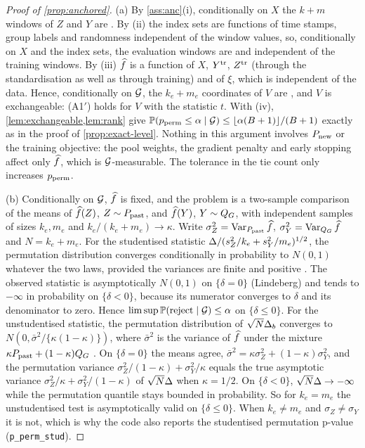 \begin{proof}[Proof of \cref{prop:anchored}]
(a) By \cref{ass:anc}(i), conditionally on $X$ the $k+m$ windows of $Z$ and $Y$ are \iid. By (ii)
the index sets are functions of time stamps, group labels and randomness independent of the
window values, so, conditionally on $X$ and the index sets, the evaluation windows are \iid{} and
independent of the training windows. By (iii) $\widehat{f}$ is a function of $X$, $Y^{\mathrm{tr}}$, $Z^{\mathrm{tr}}$
(through the standardisation as well as through training) and of $\xi$, which is independent of
the data. Hence, conditionally on $\mathcal{G}$, the $k_e+m_e$ coordinates of $V$ are \iid{}, and $V$ is
exchangeable: (A1$'$) holds for $V$ with the statistic $t$. With (iv), \cref{lem:exchangeable,lem:rank}
give $\mathbb{P}(p_{\mathrm{perm}}\le\alpha\mid\mathcal{G})\le\lfloor\alpha(B+1)\rfloor/(B+1)$ exactly as in the proof of
\cref{prop:exact-level}. Nothing in this argument involves $P_{\mathrm{new}}$ or the training objective: the
pool weights, the gradient penalty and early stopping affect only $\widehat{f}$, which is
$\mathcal{G}$-measurable. The tolerance in the tie count only increases $p_{\mathrm{perm}}$.

(b) Conditionally on $\mathcal{G}$, $\widehat{f}$ is fixed, and the problem is a two-sample comparison of the
means of $\widehat{f}(Z)$, $Z\sim P_{\mathrm{past}}$, and $\widehat{f}(Y)$, $Y\sim Q_{G}$, with independent \iid{} samples of
sizes $k_e,m_e$ and $k_e/(k_e+m_e)\to\kappa$. Write $\sigma_Z^2=\operatorname{Var}_{P_{\mathrm{past}}}\widehat{f}$,
$\sigma_Y^2=\operatorname{Var}_{Q_{G}}\widehat{f}$ and $N=k_e+m_e$. For the studentised statistic
$\Delta/(s_Z^2/k_e+s_Y^2/m_e)^{1/2}$, the permutation distribution converges conditionally in
probability to $N(0,1)$ whatever the two laws, provided the variances are finite and positive
\citep{janssen1997studentized,chung2013exact}. The observed statistic is asymptotically $N(0,1)$ on
$\{\delta=0\}$ (Lindeberg) and tends to $-\infty$ in probability on $\{\delta<0\}$, because its
numerator converges to $\delta$ and its denominator to zero. Hence
$\limsup\mathbb{P}(\text{reject}\mid\mathcal{G})\le\alpha$ on $\{\delta\le0\}$. For the unstudentised
statistic, the permutation distribution of $\sqrt N\Delta_b$ converges to $N(0,\bar\sigma^2/\{\kappa(1-\kappa)\})$,
where $\bar\sigma^2$ is the variance of $\widehat{f}$ under the mixture $\kappa P_{\mathrm{past}}+(1-\kappa)Q_{G}$
\citep{chung2013exact}. On $\{\delta=0\}$ the means agree, $\bar\sigma^2=\kappa\sigma_Z^2+(1-\kappa)\sigma_Y^2$,
and the permutation variance $\sigma_Z^2/(1-\kappa)+\sigma_Y^2/\kappa$ equals the true asymptotic
variance $\sigma_Z^2/\kappa+\sigma_Y^2/(1-\kappa)$ of $\sqrt N\Delta$ when $\kappa=1/2$. On
$\{\delta<0\}$, $\sqrt N\Delta\to-\infty$ while the permutation quantile stays bounded in
probability. So for $k_e=m_e$ the unstudentised test is asymptotically valid on $\{\delta\le0\}$.
When $k_e\neq m_e$ and $\sigma_Z\neq\sigma_Y$ it is not, which is why the code also reports the
studentised permutation p-value (\texttt{p\_perm\_stud}).


\end{proof}
